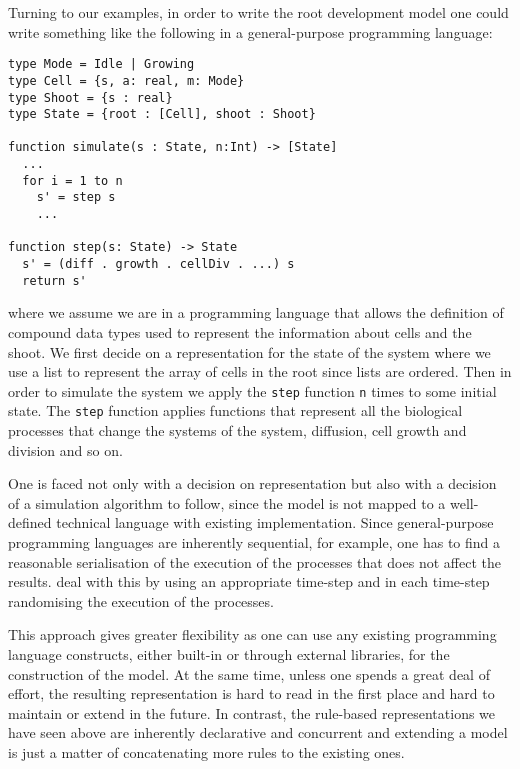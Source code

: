 Turning to our examples, in order to write the root development model one could
write something like the following in a general-purpose programming language:

\begin{BVerbatim}
type Mode = Idle | Growing
type Cell = {s, a: real, m: Mode}
type Shoot = {s : real}
type State = {root : [Cell], shoot : Shoot}

function simulate(s : State, n:Int) -> [State]
  ...
  for i = 1 to n
    s' = step s
    ...

function step(s: State) -> State
  s' = (diff . growth . cellDiv . ...) s
  return s'
\end{BVerbatim}

where we assume we are in a programming language that allows the definition of
compound data types used to represent the information about cells and the
shoot. We first decide on a representation for the state of the system where we
use a list to represent the array of cells in the root since lists are
ordered. Then in order to simulate the system we apply the \texttt{step}
function \texttt{n} times to some initial state. The \texttt{step} function
applies functions that represent all the biological processes that change the
systems of the system, diffusion, cell growth and division and so on.

One is faced not only with a decision on representation but also with a decision
of a simulation algorithm to follow, since the model is not mapped to a
well-defined technical language with existing implementation. Since
general-purpose programming languages are inherently sequential, for example,
one has to find a reasonable serialisation of the execution of the processes
that does not affect the results. \citet{karr_whole-cell_2012} deal with this by
using an appropriate time-step and in each time-step randomising the execution
of the processes.

This approach gives greater flexibility as one can use any existing programming
language constructs, either built-in or through external libraries, for the
construction of the model. At the same time, unless one spends a great deal of
effort, the resulting representation is hard to read in the first place and hard
to maintain or extend in the future. In contrast, the rule-based representations
we have seen above are inherently declarative and concurrent and extending a
model is just a matter of concatenating more rules to the existing ones.

